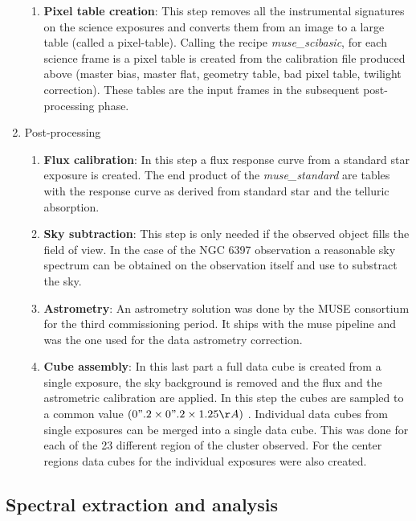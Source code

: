 \begin{enumerate}
\begin{enumerate}[I]
    \item{\textbf{Pixel table creation}}: This step removes all the instrumental signatures on the science exposures and converts them from an image to a large table (called a pixel-table). Calling the recipe \emph{muse\_scibasic}, for each science frame is a pixel table is created from the calibration file produced above (master bias, master flat, geometry table, bad pixel table, twilight correction). These tables are the input frames in the subsequent post-processing phase.
    \end{enumerate}
    \clearpage
\item Post-processing
                \begin{enumerate}[I]
			\item \textbf{Flux calibration}:  In this step a flux response curve from a standard star exposure is created. The end product of the \emph{muse\_standard} are tables with the response curve as derived from standard star and the telluric absorption.
                        \item \textbf{Sky subtraction}: This step is only needed if the observed object fills the field of view. In the case of the NGC 6397 observation a reasonable sky spectrum can be obtained on the observation itself and use to substract the sky.   
                        \item \textbf{Astrometry}: An astrometry solution was done by the MUSE consortium for the third commissioning period. It ships with the muse pipeline and was the one used for the data astrometry correction.  
          
			\item \textbf{Cube assembly}: In this last part a full data cube is created from a single exposure, the sky background is removed and the flux and the astrometric calibration are applied. In this step the cubes are sampled to a common value $(0".2 \times 0".2 \times 1.25 Å)$ . Individual data cubes from single exposures can be merged into a single data cube. This was done for each of the 23 different region of the cluster observed. For the center regions data cubes for the individual exposures were also created.  
                \end{enumerate}
\end{enumerate}


\subsection{Spectral extraction and analysis}

